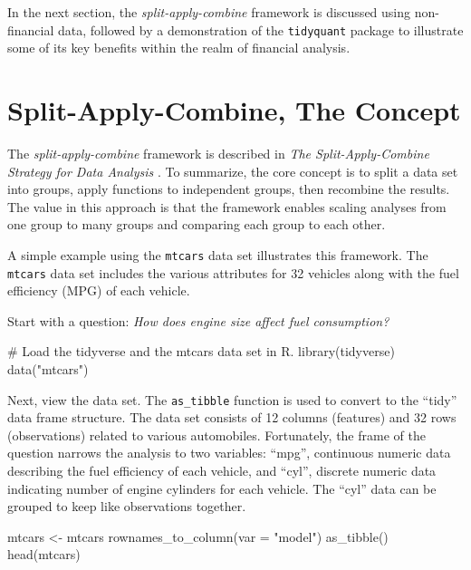 In the next section, the \emph{split-apply-combine} framework is
discussed using non-financial data, followed by a demonstration of the
\texttt{tidyquant} package to illustrate some of its key benefits within
the realm of financial analysis.

\section{Split-Apply-Combine, The
Concept}\label{split-apply-combine-the-concept}

The \emph{split-apply-combine} framework is described in \emph{The
Split-Apply-Combine Strategy for Data Analysis} \citep{plyr}. To
summarize, the core concept is to split a data set into groups, apply
functions to independent groups, then recombine the results. The value
in this approach is that the framework enables scaling analyses from one
group to many groups and comparing each group to each other.

A simple example using the \texttt{mtcars} data set illustrates this
framework. The \texttt{mtcars} data set includes the various attributes
for 32 vehicles along with the fuel efficiency (MPG) of each vehicle.

Start with a question: \emph{How does engine size affect fuel
consumption?}

\begin{Schunk}
\begin{Sinput}
# Load the tidyverse and the mtcars data set in R.
library(tidyverse)
data("mtcars")
\end{Sinput}
\end{Schunk}

Next, view the data set. The \texttt{as\_tibble} function is used to
convert to the ``tidy'' data frame structure. The data set consists of
12 columns (features) and 32 rows (observations) related to various
automobiles. Fortunately, the frame of the question narrows the analysis
to two variables: ``mpg'', continuous numeric data describing the fuel
efficiency of each vehicle, and ``cyl'', discrete numeric data
indicating number of engine cylinders for each vehicle. The ``cyl'' data
can be grouped to keep like observations together.

\begin{Schunk}
\begin{Sinput}
mtcars <- mtcars %
    rownames_to_column(var = "model") %
    as_tibble()
head(mtcars)
\end{Sinput}
\end{Schunk}


